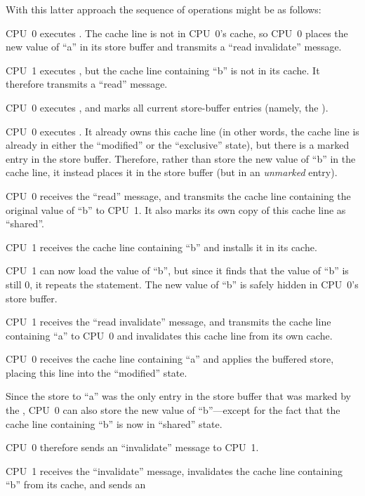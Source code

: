 With this latter approach the sequence of operations might be as follows:
\begin{sequence}
\item	CPU~0 executes .  The cache line is not in
	CPU~0's cache, so CPU~0 places the new value of ``a'' in its
	store buffer and transmits a ``read invalidate'' message.
\item	CPU~1 executes , but the cache line
	containing ``b'' is not in its cache.
	It therefore transmits a ``read'' message.
\item	CPU~0 executes , and marks all current store-buffer
	entries (namely, the ).
\item	CPU~0 executes .
	It already owns this cache line (in other words, the cache line
	is already in either the ``modified'' or the ``exclusive'' state),
	but there is a marked entry in the store buffer.
	Therefore, rather than store the new value of ``b'' in the
	cache line, it instead places it in the store buffer (but
	in an \emph{unmarked} entry).
\item	CPU~0 receives the ``read'' message, and transmits the
	cache line containing the original value of ``b''
	to CPU~1.
	It also marks its own copy of this cache line as ``shared''.
\item	CPU~1 receives the cache line containing ``b'' and installs
	it in its cache.
\item	CPU~1 can now load the value of ``b'',
	but since it finds that the value of ``b'' is still 0, it repeats
	the  statement.
	The new value of ``b'' is safely hidden in CPU~0's store buffer.
\item	CPU~1 receives the ``read invalidate'' message, and
	transmits the cache line containing ``a'' to CPU~0 and
	invalidates this cache line from its own cache.
\item	CPU~0 receives the cache line containing ``a'' and applies
	the buffered store, placing this line into the ``modified''
	state.
\item	Since the store to ``a'' was the only
	entry in the store buffer that was marked by the ,
	CPU~0 can also store the new value of ``b''---except for the
	fact that the cache line containing ``b'' is now in ``shared''
	state.
\item	CPU~0 therefore sends an ``invalidate'' message to CPU~1.
\item	CPU~1 receives the ``invalidate'' message, invalidates the
	cache line containing ``b'' from its cache, and sends an

\end{sequence}
